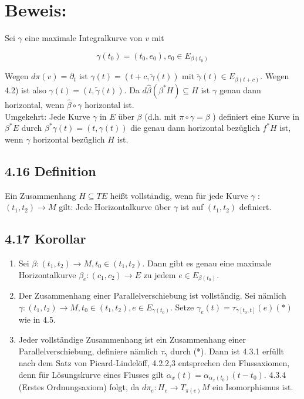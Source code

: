 \section*{Beweis:}
Sei $\gamma$ eine maximale Integralkurve von $v$ mit


\begin{equation*}
\gamma\left(t_{0}\right)=\left(t_{0}, e_{0}\right), e_{0} \in E_{\beta\left(t_{0}\right)} \tag{4.2}
\end{equation*}


Wegen $d \pi(v)=\partial_{t}$ ist $\gamma(t)=(t+c, \tilde{\gamma}(t))$ mit $\tilde{\gamma}(t) \in E_{\beta(t+c)}$. Wegen 4.2) ist also $\gamma(t)=(t, \tilde{\gamma}(t))$. Da $d \hat{\beta}\left(\beta^{*} H\right) \subseteq H$ ist $\gamma$ genau dann horizontal, wenn $\hat{\beta} \circ \gamma$ horizontal ist.\\
Umgekehrt: Jede Kurve $\gamma$ in $E$ über $\beta$ (d.h. mit $\pi \circ \gamma=\beta$ ) definiert eine Kurve in $\beta^{*} E$ durch $\beta^{*} \gamma(t)=(t, \gamma(t))$ die genau dann horizontal bezüglich $f^{*} H$ ist, wenn $\gamma$ horizontal bezüglich $H$ ist.

\subsection*{4.16 Definition}
Ein Zusammenhang $H \subseteq T E$ heißt vollständig, wenn für jede Kurve $\gamma$ : $\left(t_{1}, t_{2}\right) \rightarrow M$ gilt: Jede Horizontalkurve über $\gamma$ ist auf $\left(t_{1}, t_{2}\right)$ definiert.

\subsection*{4.17 Korollar}
\begin{enumerate}
  \item Sei $\beta:\left(t_{1}, t_{2}\right) \rightarrow M, t_{0} \in\left(t_{1}, t_{2}\right)$. Dann gibt es genau eine maximale Horizontalkurve $\beta_{e}:\left(c_{1}, c_{2}\right) \rightarrow E$ zu jedem $e \in E_{\beta\left(t_{0}\right)}$.
  \item Der Zusammenhang einer Parallelverschiebung ist vollständig. Sei nämlich $\gamma:\left(t_{1}, t_{2}\right) \rightarrow M, t_{0} \in\left(t_{1}, t_{2}\right), e \in E_{\gamma\left(t_{0}\right)}$. Setze $\gamma_{e}(t)=\tau_{\gamma\left[t_{0}, t\right]}(e)(*)$ wie in 4.5.
  \item Jeder vollständige Zusammenhang ist ein Zusammenhang einer Parallelverschiebung, definiere nämlich $\tau_{\gamma}$ durch (*). Dann ist 4.3.1 erfüllt nach dem Satz von Picard-Lindelöff, 4.2.2,3 entsprechen den Flussaxiomen, denn für Lösungskurve eines Flusses gilt $\alpha_{x}(t)=\alpha_{\alpha_{x}\left(t_{0}\right)}\left(t-t_{0}\right)$. 4.3.4 (Erstes Ordnungsaxiom) folgt, da $d \pi_{e}: H_{e} \rightarrow T_{\pi(e)} M$ ein Isomorphismus ist.
\end{enumerate}

